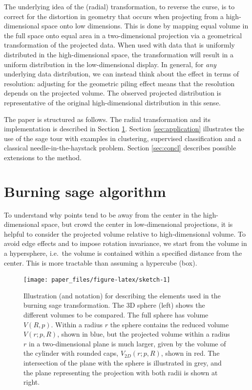 \documentclass[]{interact}
\theoremstyle{plain}%
\theoremstyle{definition}
\theoremstyle{remark}
\begin{document}
The underlying idea of the (radial) transformation, to reverse the
curse, is to correct for the distortion in geometry that occurs when
projecting from a high-dimensional space onto low dimensions. This is
done by mapping equal volume in the full space onto equal area in a
two-dimensional projection via a geometrical transformation of the
projected data. When used with data that is uniformly distributed in the
high-dimensional space, the transformation will result in a uniform
distribution in the low-dimensional display. In general, for
\textit{any} underlying data distribution, we can instead think about
the effect in terms of resolution: adjusting for the geometric piling
effect means that the resolution depends on the projected volume. The
observed projected distribution is representative of the original
high-dimensional distribution in this sense.

The paper is structured as follows. The radial transformation and its
implementation is described in Section \ref{sec:method}. Section
\ref{sec:application} illustrates the use of the sage tour with examples
in clustering, supervised classification and a classical
needle-in-the-haystack problem. Section \ref{sec:concl} describes
possible extensions to the method.

\hypertarget{sec:method}{%
\section{Burning sage algorithm}\label{sec:method}}

To understand why points tend to be away from the center in the
high-dimensional space, but crowd the center in low-dimensional
projections, it is helpful to consider the projected volume relative to
high-dimensional volume. To avoid edge effects and to impose rotation
invariance, we start from the volume in a hypersphere, i.e.~the volume
is contained within a specified distance from the center. This is more
tractable than assuming a hypercube (box).

\begin{figure}

{\centering \texttt{[image: paper\_files/figure-latex/sketch-1]} 

}

\caption{Illustration (and notation) for describing the elements used in the burning sage transformation. The 3D sphere (left) shows the different volumes to be compared. The full sphere has volume $V(R, p)$. Within a radius $r$ the sphere contains the reduced volume $V(r; p, R)$, shown in blue, but the projected volume within a radius $r$ in a two-dimensional plane is much larger, given by the volume of the cylinder with rounded caps, $V_{2D}(r; p ,R)$, shown in red. The intersection of the plane with the sphere is illustrated in grey, and the plane representing the projection with both radii is shown at right.}\label{fig:sketch}
\end{figure}
\end{document}
